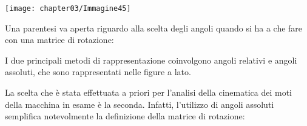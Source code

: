 			 \begin{minipage}{.5\textwidth}
			 	\centering
			 	\texttt{[image: chapter03/Immagine45]}
			 \end{minipage}
			 \hfill
			 \begin{minipage}{.5\textwidth}
			Una parentesi va aperta riguardo alla scelta degli angoli quando si ha a che fare con una matrice di rotazione:\newline
			
			I due principali metodi di rappresentazione coinvolgono angoli relativi e angoli assoluti, che sono rappresentati nelle figure a lato.
			
			La scelta che è stata effettuata a priori per l'analisi della cinematica dei moti della macchina in esame è la seconda. Infatti, l'utilizzo di angoli assoluti semplifica notevolmente la definizione della matrice di rotazione:
			\end{minipage}\newline
			

